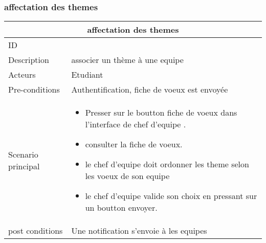 \documentclass[11pt,fleqn]{book} %
\begin{document}
\subsubsection{affectation des themes}
\begin{center}
\begin{tabularx}{1\textwidth} { | p{4cm} | >{\raggedright\arraybackslash}X |  }
  \hline
  \multicolumn{2}{|c|}{affectation des themes} \\
 \hline
 ID & 5  \\
 \hline
 Description  & associer un thème à une equipe \\
  \hline
 Acteurs  & Etudiant   \\
  \hline
 Pre-conditions  & Authentification, fiche de voeux est envoyée\\
 \hline
 Scenario principal  &  
 \begin{itemize}
     \item Presser sur le boutton fiche de voeux dans l’interface de chef d’equipe .
     \item consulter la fiche de voeux.
     \item le chef d’equipe doit ordonner les theme selon les voeux de son equipe
     \item le chef d’equipe valide son choix en pressant sur un boutton envoyer.

 \end{itemize}\\
  \hline
 post conditions  &  Une notification s’envoie à les equipes  \\
  \hline
\end{tabularx}
\label{tbl:nicetablelesstable}
\end{center}
\end{document}
